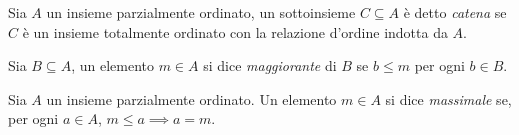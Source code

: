 \begin{defn}
  Sia $A$ un insieme parzialmente ordinato, un sottoinsieme $C \subseteq A$ è detto \textit{catena} se $C$ è un insieme totalmente ordinato con la relazione d'ordine indotta da $A$.
\end{defn}

\begin{defn}
  Sia $B \subseteq A$, un elemento $m \in A$ si dice \textit{maggiorante} di $B$ se $b \le m$ per ogni $b \in B$.
\end{defn}

\begin{defn}
  Sia $A$ un insieme parzialmente ordinato. Un elemento $m \in A$ si dice \textit{massimale} se, per ogni $a \in A$, $m \le a \implies a=m$.
\end{defn}


